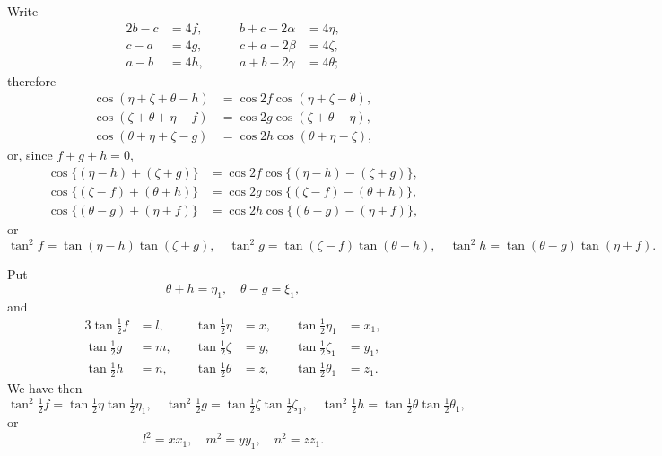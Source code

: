 \documentclass[11pt,a4paper]{article}
\theoremstyle{plain}
\begin{document}
Write
\begin{alignat*}{2}
b - c &= 4f, &\qquad b + c - 2\alpha &= 4\eta,\\
c - a &= 4g, &\qquad c + a - 2\beta  &= 4\zeta,\\
a - b &= 4h, &\qquad a + b - 2\gamma  &= 4\theta;
\end{alignat*}
therefore
\begin{align*}
\cos(\eta + \zeta + \theta - h) &= \cos 2f\cos(\eta + \zeta - \theta),\\
\cos(\zeta + \theta + \eta - f) &= \cos 2g\cos(\zeta + \theta - \eta),\\
\cos(\theta + \eta + \zeta - g) &= \cos 2h\cos(\theta + \eta - \zeta),
\end{align*}
or, since $f + g + h = 0$,
\begin{align*}
\cos\{(\eta - h) + (\zeta + g)\} &= \cos 2f\cos\{(\eta - h) - (\zeta + g)\},\\
\cos\{(\zeta - f) + (\theta + h)\} &= \cos 2g\cos\{(\zeta - f) - (\theta + h)\},\\
\cos\{(\theta - g) + (\eta + f)\} &= \cos 2h\cos\{(\theta - g) - (\eta + f)\},
\end{align*}
or
\[
\tan^2 f = \tan(\eta - h)\tan(\zeta + g),\quad
\tan^2 g = \tan(\zeta - f)\tan(\theta + h),\quad
\tan^2 h = \tan(\theta - g)\tan(\eta + f).
\]

Put
\[
\theta + h = \eta_1,\quad \theta - g = \xi_1,
\]
and
\begin{alignat*}{3}
\tan\tfrac{1}{2}f &= l, &\quad \tan\tfrac{1}{2}\eta &= x, &\quad \tan\tfrac{1}{2}\eta_1 &= x_1,\\
\tan\tfrac{1}{2}g &= m, &\quad \tan\tfrac{1}{2}\zeta &= y, &\quad \tan\tfrac{1}{2}\zeta_1 &= y_1,\\
\tan\tfrac{1}{2}h &= n, &\quad \tan\tfrac{1}{2}\theta &= z, &\quad \tan\tfrac{1}{2}\theta_1 &= z_1.
\end{alignat*}
We have then
\[
\tan^2\tfrac{1}{2}f = \tan\tfrac{1}{2}\eta\tan\tfrac{1}{2}\eta_1,\quad
\tan^2\tfrac{1}{2}g = \tan\tfrac{1}{2}\zeta\tan\tfrac{1}{2}\zeta_1,\quad
\tan^2\tfrac{1}{2}h = \tan\tfrac{1}{2}\theta\tan\tfrac{1}{2}\theta_1,
\]
or
\[
l^2 = xx_1,\quad m^2 = yy_1,\quad n^2 = zz_1.
\]
\end{document}
